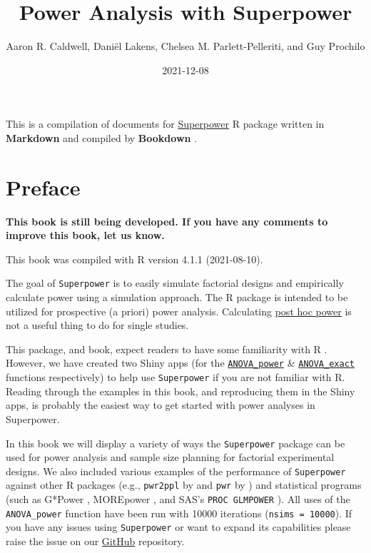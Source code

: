 \documentclass[
]{book}
\title{Power Analysis with Superpower}
\author{Aaron R. Caldwell, Daniël Lakens, Chelsea M. Parlett-Pelleriti, and Guy Prochilo}
\date{2021-12-08}
\newenvironment{Shaded}{\begin{snugshade}}{\end{snugshade}}
\begin{document}
\maketitle

{
\setcounter{tocdepth}{1}
\tableofcontents
}
\begin{Shaded}
\begin{Highlighting}[]

\end{Highlighting}
\end{Shaded}

This is a compilation of documents for \href{https://github.com/arcaldwell49/Superpower}{Superpower} R package written in \textbf{Markdown} \citep{R-rmarkdown} and compiled by \textbf{Bookdown} \citep{R-bookdown}.

\hypertarget{preface}{%
\chapter*{Preface}\label{preface}}

\textbf{This book is still being developed. If you have any comments to improve this book, let us know.}

This book was compiled with R version 4.1.1 (2021-08-10).

The goal of \texttt{Superpower} is to easily simulate factorial designs and empirically calculate power using a simulation approach.
The R package is intended to be utilized for prospective (a priori) power analysis. Calculating \href{http://daniellakens.blogspot.com/2014/12/observed-power-and-what-to-do-if-your.html}{post hoc power} is not a useful thing to do for single studies.

This package, and book, expect readers to have some familiarity with R \citeyearpar{R-base}. However, we have created two Shiny apps (for the \href{https://arcaldwell49.github.io/project/shinypowerapp/}{\texttt{ANOVA\_power}} \& \href{https://arcaldwell49.github.io/project/shinyexactapp/}{\texttt{ANOVA\_exact}} functions respectively) to help use \texttt{Superpower} if you are not familiar with R. Reading through the examples in this book, and reproducing them in the Shiny apps, is probably the easiest way to get started with power analyses in Superpower.

In this book we will display a variety of ways the \texttt{Superpower} package can be used for power analysis and sample size planning for factorial experimental designs. We also included various examples of the performance of \texttt{Superpower} against other R packages (e.g., \texttt{pwr2ppl} by \citet{R-pwr2ppl} and \texttt{pwr} by \citet{R-pwr}) and statistical programs (such as G*Power \citet{faul2007g}, MOREpower \citet{Campbell2012MorePower6F}, and SAS's \texttt{PROC\ GLMPOWER} \citeyearpar{SASglmpower}). All uses of the \texttt{ANOVA\_power} function have been run with 10000 iterations (\texttt{nsims\ =\ 10000}). If you have any issues using \texttt{Superpower} or want to expand its capabilities please raise the issue on our \href{https://github.com/arcaldwell49/Superpower/issues}{GitHub} repository.
\end{document}
